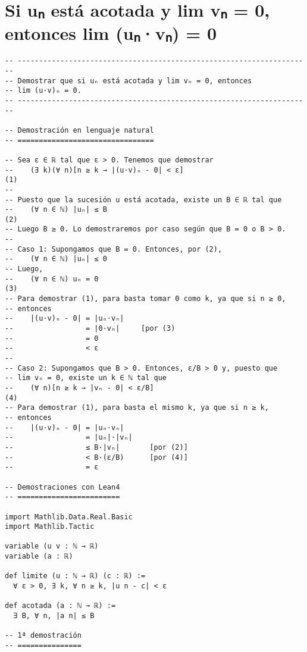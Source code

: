 \section{Si uₙ está acotada y lim vₙ = 0, entonces lim (uₙ·vₙ) = 0}
\label{sec:orge9ac839}
\begin{verbatim}
-- ---------------------------------------------------------------------
-- Demostrar que si uₙ está acotada y lim vₙ = 0, entonces
-- lim (u·v)ₙ = 0.
-- ---------------------------------------------------------------------

-- Demostración en lenguaje natural
-- ================================

-- Sea ε ∈ ℝ tal que ε > 0. Tenemos que demostrar
--    (∃ k)(∀ n)[n ≥ k → |(u·v)ₙ - 0| < ε]                           (1)
--
-- Puesto que la sucesión u está acotada, existe un B ∈ ℝ tal que
--    (∀ n ∈ ℕ) |uₙ| ≤ B                                             (2)
-- Luego B ≥ 0. Lo demostraremos por caso según que B = 0 o B > 0.
--
-- Caso 1: Supongamos que B = 0. Entonces, por (2),
--    (∀ n ∈ ℕ) |uₙ| ≤ 0
-- Luego,
--    (∀ n ∈ ℕ) uₙ = 0                                               (3)
-- Para demostrar (1), para basta tomar 0 como k, ya que si n ≥ 0,
-- entonces
--    |(u·v)ₙ - 0| = |uₙ·vₙ|
--                 = |0·vₙ|     [por (3)
--                 = 0
--                 < ε
--
-- Caso 2: Supongamos que B > 0. Entonces, ε/B > 0 y, puesto que
-- lim vₙ = 0, existe un k ∈ ℕ tal que
--    (∀ n)[n ≥ k → |vₙ - 0| < ε/B]                                  (4)
-- Para demostrar (1), para basta el mismo k, ya que si n ≥ k,
-- entonces
--    |(u·v)ₙ - 0| = |uₙ·vₙ|
--                 = |uₙ|·|vₙ|
--                 ≤ B·|vₙ|       [por (2)]
--                 < B·(ε/B)      [por (4)]
--                 = ε

-- Demostraciones con Lean4
-- ========================

import Mathlib.Data.Real.Basic
import Mathlib.Tactic

variable (u v : ℕ → ℝ)
variable (a : ℝ)

def limite (u : ℕ → ℝ) (c : ℝ) :=
  ∀ ε > 0, ∃ k, ∀ n ≥ k, |u n - c| < ε

def acotada (a : ℕ → ℝ) :=
  ∃ B, ∀ n, |a n| ≤ B

-- 1ª demostración
-- ===============


\end{verbatim}
